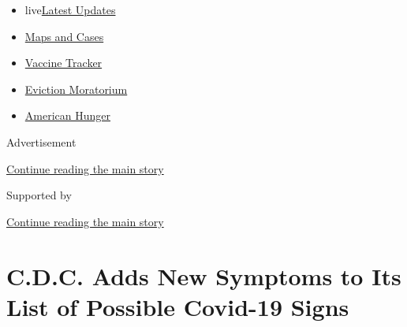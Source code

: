 \begin{itemize}
\tightlist
\item
  live\href{https://www.nytimes3xbfgragh.onion/2020/09/05/world/coronavirus-covid.html?name=styln-coronavirus-national\&region=TOP_BANNER\&block=storyline_menu_recirc\&action=click\&pgtype=Article\&impression_id=5aee3ea0-efba-11ea-9102-5f07916f2c42\&variant=undefined}{Latest
  Updates}
\item
  \href{https://www.nytimes3xbfgragh.onion/interactive/2020/us/coronavirus-us-cases.html?name=styln-coronavirus-national\&region=TOP_BANNER\&block=storyline_menu_recirc\&action=click\&pgtype=Article\&impression_id=5aee3ea1-efba-11ea-9102-5f07916f2c42\&variant=undefined}{Maps
  and Cases}
\item
  \href{https://www.nytimes3xbfgragh.onion/interactive/2020/science/coronavirus-vaccine-tracker.html?name=styln-coronavirus-national\&region=TOP_BANNER\&block=storyline_menu_recirc\&action=click\&pgtype=Article\&impression_id=5aee3ea2-efba-11ea-9102-5f07916f2c42\&variant=undefined}{Vaccine
  Tracker}
\item
  \href{https://www.nytimes3xbfgragh.onion/2020/09/02/your-money/eviction-moratorium-covid.html?name=styln-coronavirus-national\&region=TOP_BANNER\&block=storyline_menu_recirc\&action=click\&pgtype=Article\&impression_id=5aee3ea3-efba-11ea-9102-5f07916f2c42\&variant=undefined}{Eviction
  Moratorium}
\item
  \href{https://www.nytimes3xbfgragh.onion/interactive/2020/09/02/magazine/food-insecurity-hunger-us.html?name=styln-coronavirus-national\&region=TOP_BANNER\&block=storyline_menu_recirc\&action=click\&pgtype=Article\&impression_id=5aee3ea4-efba-11ea-9102-5f07916f2c42\&variant=undefined}{American
  Hunger}
\end{itemize}

Advertisement

\protect\hyperlink{after-top}{Continue reading the main story}

Supported by

\protect\hyperlink{after-sponsor}{Continue reading the main story}

\hypertarget{cdc-adds-new-symptoms-to-its-list-of-possible-covid-19-signs}{%
\section{C.D.C. Adds New Symptoms to Its List of Possible Covid-19
Signs}\label{cdc-adds-new-symptoms-to-its-list-of-possible-covid-19-signs}}

